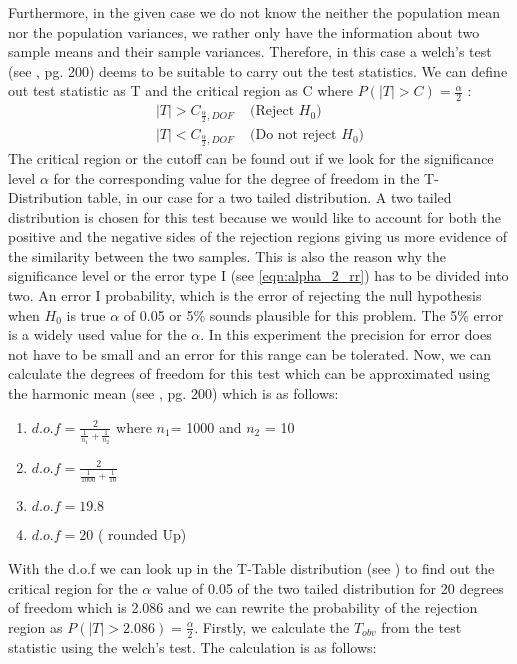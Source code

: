 Furthermore, in the given case we do not know the neither the population mean nor the population variances, we rather only have the information about two sample means and their sample variances. Therefore, in this case a welch's test (see \cite{hogg:2005}, pg. 200) deems to be suitable to carry out the test statistics. We can define out test statistic as T and the critical region as C where $P(|T| > C) =\frac{\alpha}{2}$ \label{eqn:alpha_2_rr}:
\begin{equation}
    \begin{split}
      |T| > C_{\frac{\alpha}{2}, DOF}& \text{ (Reject $H_0$)}\\
      |T| < C_{\frac{\alpha}{2}, DOF}& \text{ (Do not reject $H_0$)}
    \end{split}
\end{equation}
The critical region or the cutoff can be found out if we look for the significance level $\alpha$ for the corresponding value for the degree of freedom in the T-Distribution table, in our case for a two tailed distribution. A two tailed distribution is chosen for this test because we would like to account for both the positive and the negative sides of the rejection regions giving us more evidence of the similarity between the two samples. This is also the reason why the significance level or the error type I (see \ref{eqn:alpha_2_rr}) has to be divided into two. \newline \newline
An error I probability, which is the error of rejecting the null hypothesis when $H_0$ is true $\alpha$ of 0.05 or 5\% sounds plausible for this problem. The 5\% error is a widely used value for the $\alpha$. In this experiment the precision for error does not have to be small and an error for this range can be tolerated. Now, we can calculate the degrees of freedom for this test which can be approximated using the harmonic mean (see \cite{Iubh:2021}, pg. 200) which is as follows:
\begin{enumerate}
    \item $d.o.f = \frac{2}{\frac{1}{n_1}+\frac{1}{n_2}}$ where $n_1$= 1000 and $n_2$ = 10
    \item $d.o.f = \frac{2}{\frac{1}{1000}+\frac{1}{10}}$
    \item $d.o.f = 19.8$
    \item $d.o.f = 20$ ( rounded Up)
\end{enumerate}
With the d.o.f we can look up in the T-Table distribution (see \cite{t-table}) to find out the critical region for the $\alpha$ value of 0.05 of the two tailed distribution for 20 degrees of freedom which is 2.086 and we can rewrite the probability of the rejection region as $P(|T| > 2.086) = \frac{\alpha}{2}$. Firstly, we calculate the $T_{obv}$ from the test statistic using the welch's test. The calculation is as follows:
